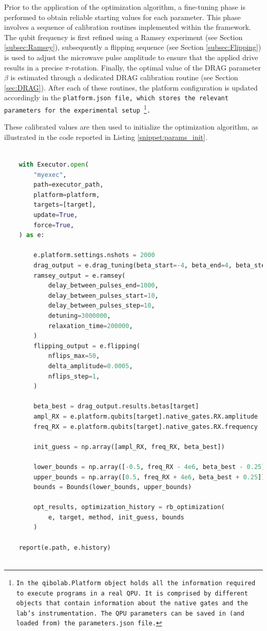 Prior to the application of the optimization algorithm, a fine-tuning phase is performed to obtain reliable starting values for each parameter. 
This phase involves a sequence of calibration routines implemented within the \Qibocal framework.
The qubit frequency is first refined using a Ramsey experiment (see Section \ref{subsec:Ramsey}), subsequently a flipping sequence (see Section \ref{subsec:Flipping}) is used to adjust the microwave pulse amplitude to ensure that the applied drive results in a precise $\pi$-rotation.
Finally, the optimal value of the DRAG parameter $\beta$ is estimated through a dedicated DRAG calibration routine (see Section \ref{sec:DRAG}).
After each of these routines, the platform configuration is updated accordingly in the \tt{platform.json} file, which stores the relevant parameters for the experimental setup 
\footnote{In \Qibolab the \tt{qibolab.Platform} object holds all the information required to execute programs in a real QPU. It is comprised by different objects that contain information about the native gates and the lab's instrumentation. The QPU parameters can be saved in (and loaded from) the \tt{parameters.json} file.}.

These calibrated values are then used to initialize the optimization algorithm, as illustrated in the code reported in Listing \ref{snippet:params_init}.

\begin{lstlisting}[language=Python, caption={Code to set up the RX gate optimization experiment.}, label={snippet:params_init}]
    
    with Executor.open(
        "myexec",
        path=executor_path,
        platform=platform,
        targets=[target],
        update=True,
        force=True,
    ) as e:
    
        e.platform.settings.nshots = 2000
        drag_output = e.drag_tuning(beta_start=-4, beta_end=4, beta_step=0.5)
        ramsey_output = e.ramsey(
            delay_between_pulses_end=1000,
            delay_between_pulses_start=10,
            delay_between_pulses_step=10,
            detuning=3000000,
            relaxation_time=200000,
        )
        flipping_output = e.flipping(
            nflips_max=50,
            delta_amplitude=0.0005,  
            nflips_step=1,
        )
    
        beta_best = drag_output.results.betas[target]
        ampl_RX = e.platform.qubits[target].native_gates.RX.amplitude
        freq_RX = e.platform.qubits[target].native_gates.RX.frequency
    
        init_guess = np.array([ampl_RX, freq_RX, beta_best])
    
        lower_bounds = np.array([-0.5, freq_RX - 4e6, beta_best - 0.25])
        upper_bounds = np.array([0.5, freq_RX + 4e6, beta_best + 0.25])
        bounds = Bounds(lower_bounds, upper_bounds)
    
        opt_results, optimization_history = rb_optimization(
            e, target, method, init_guess, bounds
        )
    
    report(e.path, e.history)
    
\end{lstlisting}

